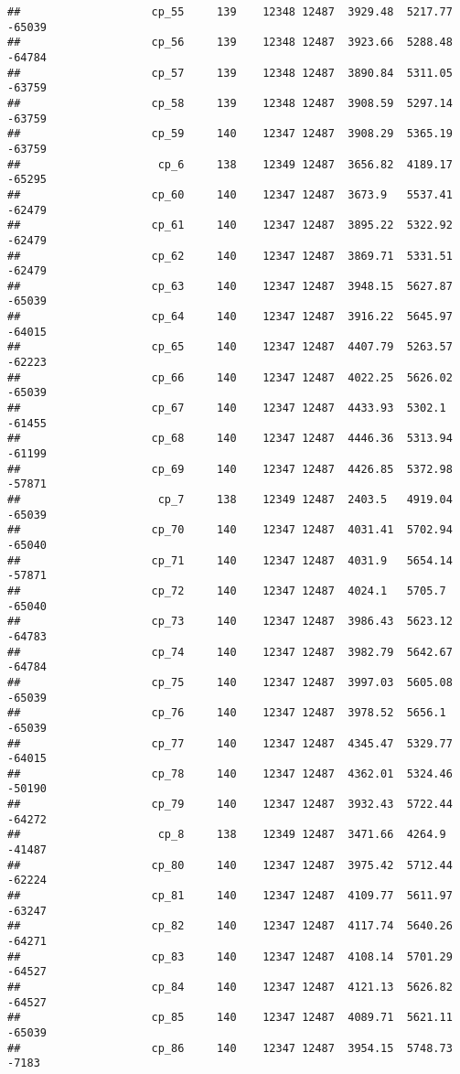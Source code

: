 \documentclass[]{article}
\begin{document}
\begin{verbatim}
##                    cp_55     139    12348 12487  3929.48  5217.77 -65039
##                    cp_56     139    12348 12487  3923.66  5288.48 -64784
##                    cp_57     139    12348 12487  3890.84  5311.05 -63759
##                    cp_58     139    12348 12487  3908.59  5297.14 -63759
##                    cp_59     140    12347 12487  3908.29  5365.19 -63759
##                     cp_6     138    12349 12487  3656.82  4189.17 -65295
##                    cp_60     140    12347 12487  3673.9   5537.41 -62479
##                    cp_61     140    12347 12487  3895.22  5322.92 -62479
##                    cp_62     140    12347 12487  3869.71  5331.51 -62479
##                    cp_63     140    12347 12487  3948.15  5627.87 -65039
##                    cp_64     140    12347 12487  3916.22  5645.97 -64015
##                    cp_65     140    12347 12487  4407.79  5263.57 -62223
##                    cp_66     140    12347 12487  4022.25  5626.02 -65039
##                    cp_67     140    12347 12487  4433.93  5302.1  -61455
##                    cp_68     140    12347 12487  4446.36  5313.94 -61199
##                    cp_69     140    12347 12487  4426.85  5372.98 -57871
##                     cp_7     138    12349 12487  2403.5   4919.04 -65039
##                    cp_70     140    12347 12487  4031.41  5702.94 -65040
##                    cp_71     140    12347 12487  4031.9   5654.14 -57871
##                    cp_72     140    12347 12487  4024.1   5705.7  -65040
##                    cp_73     140    12347 12487  3986.43  5623.12 -64783
##                    cp_74     140    12347 12487  3982.79  5642.67 -64784
##                    cp_75     140    12347 12487  3997.03  5605.08 -65039
##                    cp_76     140    12347 12487  3978.52  5656.1  -65039
##                    cp_77     140    12347 12487  4345.47  5329.77 -64015
##                    cp_78     140    12347 12487  4362.01  5324.46 -50190
##                    cp_79     140    12347 12487  3932.43  5722.44 -64272
##                     cp_8     138    12349 12487  3471.66  4264.9  -41487
##                    cp_80     140    12347 12487  3975.42  5712.44 -62224
##                    cp_81     140    12347 12487  4109.77  5611.97 -63247
##                    cp_82     140    12347 12487  4117.74  5640.26 -64271
##                    cp_83     140    12347 12487  4108.14  5701.29 -64527
##                    cp_84     140    12347 12487  4121.13  5626.82 -64527
##                    cp_85     140    12347 12487  4089.71  5621.11 -65039
##                    cp_86     140    12347 12487  3954.15  5748.73  -7183

\end{verbatim}
\end{document}
